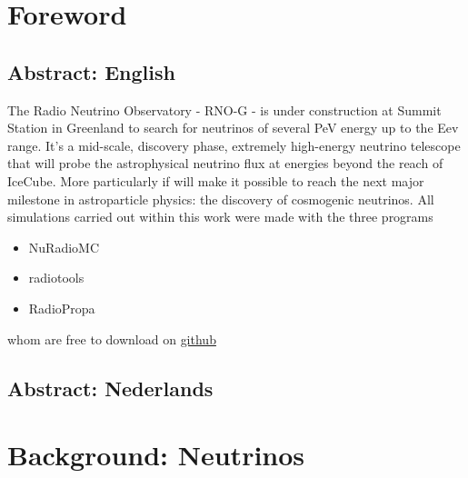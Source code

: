 \documentclass[11pt,a4paper,faculty=we,language=en,doctype=report]{cls/ugent-doc}
\renewcommand{\ULthickness}{2pt} %
\begin{document}

\maketitle
\renewcommand{\ULthickness}{1pt}


{\hypersetup{hidelinks}\tableofcontents} %
\newpage


\chapter{Foreword}
\section{Abstract: English}
The Radio Neutrino Observatory - RNO-G - is under construction at Summit Station in Greenland to search for neutrinos of several PeV energy up to the Eev range. It's a mid-scale, discovery phase, extremely high-energy neutrino telescope that will probe the astrophysical neutrino flux at energies beyond the reach of IceCube.
More particularly if will make it possible to reach the next major milestone in astroparticle physics: the discovery of cosmogenic neutrinos.
\vspace{0.5cm}
All simulations carried out within this work were made with the three programs 
\begin{itemize}
	\item NuRadioMC
	\item radiotools
	\item RadioPropa
\end{itemize}
whom are free to download on \href{https://github.com/nu-radio}{github}
\section{Abstract: Nederlands}
\chapter{Background: Neutrinos}
\end{document}

